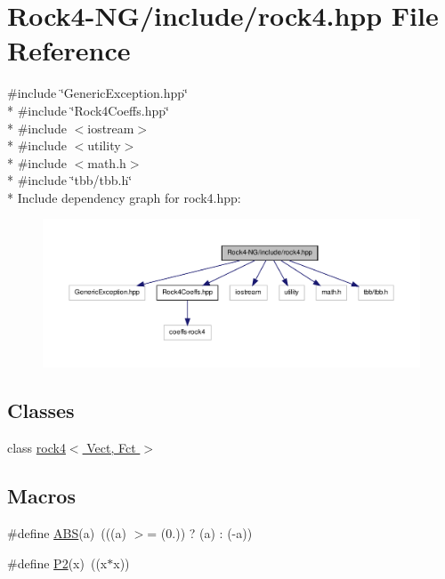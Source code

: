 \hypertarget{Rock4-NG_2include_2rock4_8hpp}{\section{Rock4-\/\-N\-G/include/rock4.hpp File Reference}
\label{Rock4-NG_2include_2rock4_8hpp}
}
{\ttfamily \#include \char`\"{}Generic\-Exception.\-hpp\char`\"{}}\\*
{\ttfamily \#include \char`\"{}Rock4\-Coeffs.\-hpp\char`\"{}}\\*
{\ttfamily \#include $<$iostream$>$}\\*
{\ttfamily \#include $<$utility$>$}\\*
{\ttfamily \#include $<$math.\-h$>$}\\*
{\ttfamily \#include \char`\"{}tbb/tbb.\-h\char`\"{}}\\*
Include dependency graph for rock4.\-hpp\-:
\nopagebreak
\begin{figure}[H]
\begin{center}
\leavevmode
\includegraphics[width=350pt]{Rock4-NG_2include_2rock4_8hpp__incl}
\end{center}
\end{figure}
\subsection*{Classes}
\begin{DoxyCompactItemize}
\item 
class \hyperlink{classrock4}{rock4$<$ Vect, Fct $>$}
\end{DoxyCompactItemize}
\subsection*{Macros}
\begin{DoxyCompactItemize}
\item 
\#define \hyperlink{Rock4-NG_2include_2rock4_8hpp_ae2f08dc603ae93c402abd918ba4e23e1}{A\-B\-S}(a)~(((a) $>$= (0.)) ? (a) \-: (-\/a))
\item 
\#define \hyperlink{Rock4-NG_2include_2rock4_8hpp_a90d9b1cbee01087dc9688be31c49bfc6}{P2}(x)~((x$\ast$x))
\end{DoxyCompactItemize}



